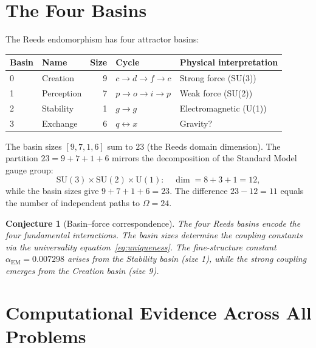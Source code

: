 \documentclass[11pt,a4paper]{article}
\theoremstyle{plain}
\newtheorem{conjecture}[theorem]{Conjecture}
\theoremstyle{definition}
\theoremstyle{remark}
\begin{document}
\section{The Four Basins}

The Reeds endomorphism has four attractor basins:

\begin{center}\small
\begin{tabular}{llrll}
\toprule
Basin & Name & Size & Cycle & Physical interpretation \\
\midrule
0 & Creation & 9 & $c \to d \to f \to c$ & Strong force (SU(3)) \\
1 & Perception & 7 & $p \to o \to i \to p$ & Weak force (SU(2)) \\
2 & Stability & 1 & $g \to g$ & Electromagnetic (U(1)) \\
3 & Exchange & 6 & $q \leftrightarrow x$ & Gravity? \\
\bottomrule
\end{tabular}
\end{center}

The basin sizes $[9,7,1,6]$ sum to $23$ (the Reeds domain dimension). The partition $23 = 9 + 7 + 1 + 6$ mirrors the decomposition of the Standard Model gauge group:
\[
\text{SU}(3) \times \text{SU}(2) \times \text{U}(1): \quad \dim = 8 + 3 + 1 = 12,
\]
while the basin sizes give $9 + 7 + 1 + 6 = 23$. The difference $23 - 12 = 11$ equals the number of independent paths to $\Omega = 24$.

\begin{conjecture}[Basin--force correspondence]
The four Reeds basins encode the four fundamental interactions. The basin sizes determine the coupling constants via the universality equation~\eqref{eq:uniqueness}. The fine-structure constant $\alpha_{\text{EM}} = 0.007298$ arises from the Stability basin (size 1), while the strong coupling emerges from the Creation basin (size 9).
\end{conjecture}

\section{Computational Evidence Across All Problems}
\end{document}
